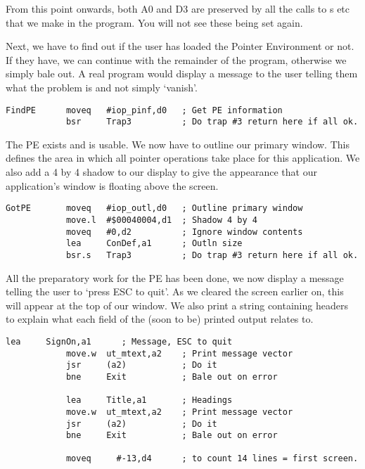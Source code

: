 From this point onwards, both A0 and D3 are preserved by all the calls to s etc that
we make in the program. You will not see these being set again.

Next, we have to find out if the user has loaded the Pointer Environment or not. If they
have, we can continue with the remainder of the program, otherwise we simply bale out. A
real program would display a message to the user telling them what the problem is and not
simply `vanish'.

\begin{lstlisting}[firstnumber=last,caption={Pointer Record Examiner - Get Pointer Environment}]
FindPE      moveq   #iop_pinf,d0   ; Get PE information
            bsr     Trap3          ; Do trap #3 return here if all ok.
\end{lstlisting}

The PE exists and is usable. We now have to outline our primary window. This defines the
area in which all pointer operations take place for this application. We also add a 4 by 4
shadow to our display to give the appearance that our application's window is floating
above the screen.

\begin{lstlisting}[firstnumber=last,caption={Pointer Record Examiner - Outline Primary Window}]
GotPE       moveq   #iop_outl,d0   ; Outline primary window
            move.l  #$00040004,d1  ; Shadow 4 by 4
            moveq   #0,d2          ; Ignore window contents
            lea     ConDef,a1      ; Outln size
            bsr.s   Trap3          ; Do trap #3 return here if all ok.
\end{lstlisting}

All the preparatory work for the PE has been done, we now display a message telling the
user to `press ESC to quit'. As we cleared the screen earlier on, this will appear at the
top of our window. We also print a string containing headers to explain what each field of
the (soon to be) printed output relates to.

\begin{lstlisting}[firstnumber=last,caption={Pointer Record Examiner - Sign On}]
            lea     SignOn,a1      ; Message, ESC to quit
            move.w  ut_mtext,a2    ; Print message vector
            jsr     (a2)           ; Do it
            bne     Exit           ; Bale out on error

            lea     Title,a1       ; Headings
            move.w  ut_mtext,a2    ; Print message vector
            jsr     (a2)           ; Do it
            bne     Exit           ; Bale out on error

            moveq     #-13,d4      ; to count 14 lines = first screen.
\end{lstlisting}

